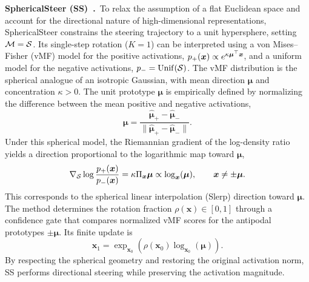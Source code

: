 \noindent\textbf{SphericalSteer (SS)~\citep{you2026spherical}.}~To relax the assumption of a flat Euclidean space and account for the directional nature of high-dimensional representations, SphericalSteer constrains the steering trajectory to a unit hypersphere, setting $\mathcal{M}=\mathcal{S}$. Its single-step rotation ($K=1$) can be interpreted using a von Mises--Fisher (vMF) model for the positive activations, $p_{+}(\boldsymbol{x})\propto e^{\kappa\boldsymbol{\mu}^{\top}\boldsymbol{x}}$, and a uniform model for the negative activations, $p_{-}=\operatorname{Unif}(\mathcal{S})$. The vMF distribution is the spherical analogue of an isotropic Gaussian, with mean direction $\boldsymbol{\mu}$ and concentration $\kappa>0$. The unit prototype $\boldsymbol{\mu}$ is empirically defined by normalizing the difference between the mean positive and negative activations,
\[
\boldsymbol{\mu}
=\frac{\widehat{\boldsymbol{\mu}}_+-\widehat{\boldsymbol{\mu}}_-}
{\|\widehat{\boldsymbol{\mu}}_+-\widehat{\boldsymbol{\mu}}_-\|}.
\]
Under this spherical model, the Riemannian gradient of the log-density ratio yields a direction proportional to the logarithmic map toward $\boldsymbol{\mu}$,
\[
\nabla_{\mathcal{S}}\log\frac{p_{+}(\boldsymbol{x})}{p_{-}(\boldsymbol{x})}
=\kappa\Pi_{\boldsymbol{x}}\boldsymbol{\mu}
\propto\log_{\boldsymbol{x}}(\boldsymbol{\mu}),
\qquad \boldsymbol{x}\neq\pm\boldsymbol{\mu}.
\]
This corresponds to the spherical linear interpolation (Slerp) direction toward $\boldsymbol{\mu}$. The method determines the rotation fraction $\rho(\boldsymbol{x})\in[0,1]$ through a confidence gate that compares normalized vMF scores for the antipodal prototypes $\pm\boldsymbol{\mu}$. Its finite update is
\[
\boldsymbol{x}_1
=\exp_{\boldsymbol{x}_0}\!\left(\rho(\boldsymbol{x}_0)\log_{\boldsymbol{x}_0}(\boldsymbol{\mu})\right).
\]
By respecting the spherical geometry and restoring the original activation norm, SS performs directional steering while preserving the activation magnitude.

